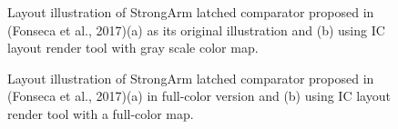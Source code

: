 \documentclass[10pt,a4paper,onecolumn]{article}
\begin{document}
\begin{figure}
 \begin{center}
   \caption{Layout illustration of StrongArm latched comparator proposed in 
   (Fonseca et al., 2017)(a) as its original illustration and (b) using IC layout render tool with gray scale color map.}
 \end{center}
\end{figure}

\begin{figure}
 \begin{center}
   \caption{Layout illustration of StrongArm latched comparator proposed in
(Fonseca et al., 2017)(a) in full-color version and (b) using IC
layout render tool with a full-color map.}
 \end{center}
\end{figure}
\end{document}

